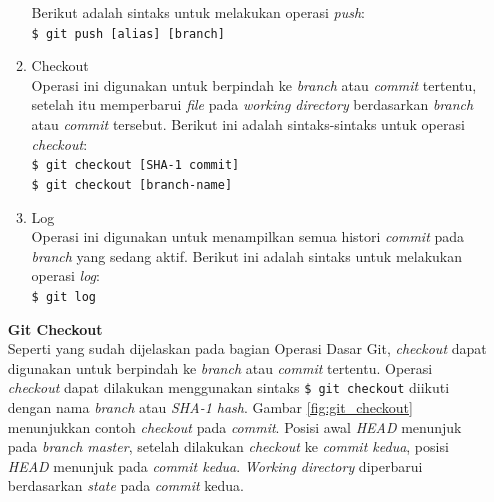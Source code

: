 \documentclass[a4paper,twoside]{article}
\begin{document}
\begin{enumerate}
\begin{enumerate}
Berikut adalah sintaks untuk melakukan operasi \textit{push}:\\
\texttt{\$ git push [alias] [branch]}
\item Checkout\\
Operasi ini digunakan untuk berpindah ke \textit{branch} atau \textit{commit} tertentu, setelah itu memperbarui \textit{file} pada \textit{working directory} berdasarkan \textit{branch} atau \textit{commit} tersebut. Berikut ini adalah sintaks-sintaks untuk operasi \textit{checkout}:\\
\texttt{\$ git checkout [SHA-1 commit]}\\
\texttt{\$ git checkout [branch-name]}
\item Log\\
Operasi ini digunakan untuk menampilkan semua histori \textit{commit} pada \textit{branch} yang sedang aktif. Berikut ini adalah sintaks untuk melakukan operasi \textit{log}:\\
\texttt{\$ git log}
\end{enumerate}

\textbf{Git Checkout}\\
Seperti yang sudah dijelaskan pada bagian Operasi Dasar Git, \textit{checkout} dapat digunakan untuk berpindah ke \textit{branch} atau \textit{commit} tertentu. Operasi \textit{checkout} dapat dilakukan menggunakan sintaks \texttt{\$ git checkout} diikuti dengan nama \textit{branch} atau \textit{SHA-1 hash}. Gambar \ref{fig:git_checkout} menunjukkan contoh \textit{checkout} pada \textit{commit}. Posisi awal \textit{HEAD} menunjuk pada \textit{branch master}, setelah dilakukan \textit{checkout} ke \textit{commit kedua}, posisi \textit{HEAD} menunjuk pada \textit{commit kedua}. \textit{Working directory} diperbarui berdasarkan \textit{state} pada \textit{commit} kedua. 


\end{enumerate}
\end{document}
